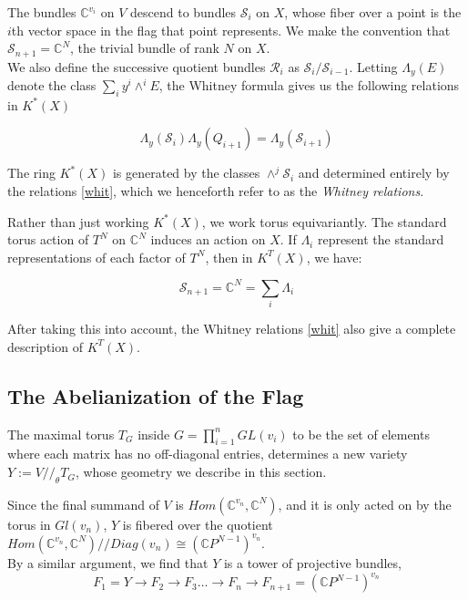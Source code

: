 \documentclass[11pt,letterpaper]{amsart}
\begin{document}
The bundles $\mathbb{C}^{v_i}$ on $V$ descend to bundles $\mathcal{S}_i$ on $X$, whose fiber over a point is the $i$th vector space in the flag that point represents. We make the convention that $\mathcal{S}_{n+1}=\mathbb{C}^{N}$, the trivial bundle of rank $N$ on $X$. \\

We also define the successive quotient bundles $\mathcal{R}_i$ as $\mathcal{S}_{i}/\mathcal{S}_{i-1}$.
Letting $\Lambda_y(E)$ denote the class $\sum_i y^i \wedge^i E$, the Whitney formula gives us the following relations in $K^*(X)$

\begin{equation}
    \label{whit}
    \Lambda_y(\mathcal{S}_i)\Lambda_y(Q_{i+1})=\Lambda_y(\mathcal{S}_{i+1})
\end{equation}

The ring $K^*(X)$ is generated by the classes $\wedge^j\mathcal{S}_i$ and determined entirely by the relations \eqref{whit}, which we henceforth refer to as the \emph{Whitney relations}. 

Rather than just working $K^*(X)$, we work torus equivariantly. The standard torus action of $T^N$ on $\mathbb{C}^N$ induces an action on $X$. If $\Lambda_i$ represent the standard representations of each factor of $T^N$, then in $K^T(X)$, we have:

$$\mathcal{S}_{n+1}=\mathbb{C}^N=\sum_i \Lambda_i$$

After taking this into account, the Whitney relations \eqref{whit} also give a complete description of $K^T(X)$. 





\subsection{The Abelianization of the Flag}
The maximal torus $T_G$ inside $G=\prod_{i=1}^n GL(v_i)$ to be the set of elements where each matrix has no off-diagonal entries, determines a new variety $Y:=V//_\theta T_G$, whose geometry we describe in this section. 

Since the final summand of $V$ is $Hom(\mathbb{C}^{v_n}, \mathbb{C}^N)$, and it is only acted on by the torus in $Gl(v_n)$, $Y$ is fibered over the quotient $Hom(\mathbb{C}^{v_n},\mathbb{C}^N)//Diag(v_n)\cong (\mathbb{C}P^{N-1})^{v_n}$. \\

By a similar argument, we find that $Y$ is a tower of projective bundles, 
$$F_1=Y\to F_2\to F_3\dots \to F_n\to  F_{n+1}=(\mathbb{C}P^{N-1})^{v_n}$$
\end{document}
